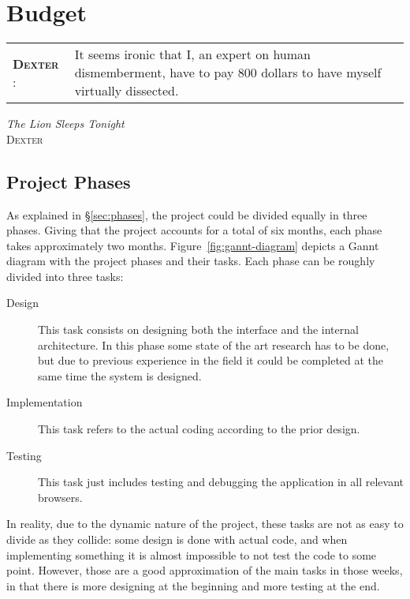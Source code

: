 \chapter{Budget} %
\label{cha:budget}

\setlength{\epigraphwidth}{9cm}
\renewcommand{\tabcolsep}{0em}

\epigraph{
\begin{tabular}{p{1.75cm}p{7cm}}
  \footnotesize{\textbf{\textsc{Dexter}} :}
    & It seems ironic that I, an expert on human dismemberment, have to pay 800 dollars to have myself virtually dissected. \\
\end{tabular}
\vspace{1em}
}{\textit{The Lion Sleeps Tonight}\\ \textsc{Dexter}}


\newpage

\section{Project Phases} %
\label{sec:project_phases}

As explained in \S\vref{sec:phases}, the project could be divided equally in three phases.
Giving that the project accounts for a total of six months, each phase takes approximately two months.
Figure~\vref{fig:gannt-diagram} depicts a Gannt diagram with the project phases and their tasks.
Each phase can be roughly divided into three tasks:

\begin{description}
  \item[Design] This task consists on designing both the interface and the internal architecture.
  In this phase some state of the art research has to be done, but due to previous experience in the field it could be completed at the same time the system is designed.
  \item[Implementation] This task refers to the actual coding according to the prior design.
  \item[Testing] This task just includes testing and debugging the application in all relevant browsers.
\end{description}

In reality, due to the dynamic nature of the project, these tasks are not as easy to divide as they collide: some design is done with actual code, and when implementing something it is almost impossible to not test the code to some point.
However, those are a good approximation of the main tasks in those weeks, in that there is more designing at the beginning and more testing at the end.

